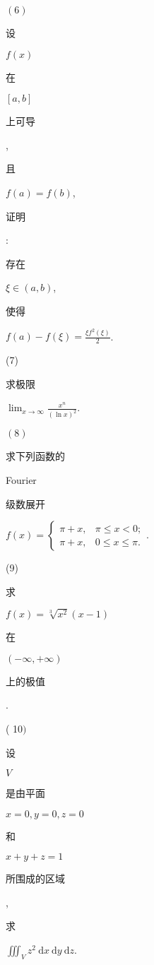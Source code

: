 \documentclass[10pt]{article}
\begin{document}
$(6)$ \begin{CJK}{UTF8}{mj}设\end{CJK} $f(x)$ \begin{CJK}{UTF8}{mj}在\end{CJK} $[a, b]$ \begin{CJK}{UTF8}{mj}上可导\end{CJK}, \begin{CJK}{UTF8}{mj}且\end{CJK} $f(a)=f(b)$, \begin{CJK}{UTF8}{mj}证明\end{CJK}: \begin{CJK}{UTF8}{mj}存在\end{CJK} $\xi \in(a, b)$, \begin{CJK}{UTF8}{mj}使得\end{CJK} $f(a)-f(\xi)=\frac{\xi f^{2}(\xi)}{2}$.

(7) \begin{CJK}{UTF8}{mj}求极限\end{CJK} $\lim _{x \rightarrow \infty} \frac{x^{n}}{(\ln x)^{2}}$.

$(8)$ \begin{CJK}{UTF8}{mj}求下列函数的\end{CJK} Fourier \begin{CJK}{UTF8}{mj}级数展开\end{CJK} $f(x)=\left\{\begin{array}{ll}\pi+x, & \pi \leqslant x<0 ; \\ \pi+x, & 0 \leqslant x \leqslant \pi .\end{array}\right.$.

(9) \begin{CJK}{UTF8}{mj}求\end{CJK} $f(x)=\sqrt[3]{x^{2}}(x-1)$ \begin{CJK}{UTF8}{mj}在\end{CJK} $(-\infty,+\infty)$ \begin{CJK}{UTF8}{mj}上的极值\end{CJK}.

( 10$)$ \begin{CJK}{UTF8}{mj}设\end{CJK} $V$ \begin{CJK}{UTF8}{mj}是由平面\end{CJK} $x=0, y=0, z=0$ \begin{CJK}{UTF8}{mj}和\end{CJK} $x+y+z=1$ \begin{CJK}{UTF8}{mj}所围成的区域\end{CJK}, \begin{CJK}{UTF8}{mj}求\end{CJK} $\iiint_{V} z^{2} \mathrm{~d} x \mathrm{~d} y \mathrm{~d} z$.
\end{document}
